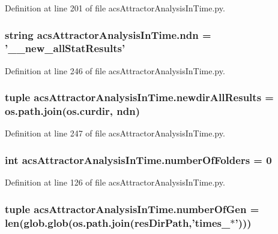 Definition at line 201 of file acs\-Attractor\-Analysis\-In\-Time.\-py.

\hypertarget{a00092_ab0e0a55161ee1fd9fb0f086a328f67b7}{
\subsubsection[{ndn}]{\setlength{\rightskip}{0pt plus 5cm}string acs\-Attractor\-Analysis\-In\-Time.\-ndn = '\-\_\-\_\-new\-\_\-all\-Stat\-Results'}}\label{a00092_ab0e0a55161ee1fd9fb0f086a328f67b7}


Definition at line 246 of file acs\-Attractor\-Analysis\-In\-Time.\-py.

\hypertarget{a00092_aaf0f6fcbaaf97dcff16b62e86df0209c}{
\subsubsection[{newdir\-All\-Results}]{\setlength{\rightskip}{0pt plus 5cm}tuple acs\-Attractor\-Analysis\-In\-Time.\-newdir\-All\-Results = os.\-path.\-join(os.\-curdir, {\bf ndn})}}\label{a00092_aaf0f6fcbaaf97dcff16b62e86df0209c}


Definition at line 247 of file acs\-Attractor\-Analysis\-In\-Time.\-py.

\hypertarget{a00092_a3a2fe097086bb0f4a505fca8f53dc2b0}{
\subsubsection[{number\-Of\-Folders}]{\setlength{\rightskip}{0pt plus 5cm}int acs\-Attractor\-Analysis\-In\-Time.\-number\-Of\-Folders = 0}}\label{a00092_a3a2fe097086bb0f4a505fca8f53dc2b0}


Definition at line 126 of file acs\-Attractor\-Analysis\-In\-Time.\-py.

\hypertarget{a00092_a28cc280ff54c726bd790cf781d3bab8c}{
\subsubsection[{number\-Of\-Gen}]{\setlength{\rightskip}{0pt plus 5cm}tuple acs\-Attractor\-Analysis\-In\-Time.\-number\-Of\-Gen = len(glob.\-glob(os.\-path.\-join({\bf res\-Dir\-Path},'times\-\_\-$\ast$')))}}\label{a00092_a28cc280ff54c726bd790cf781d3bab8c}


